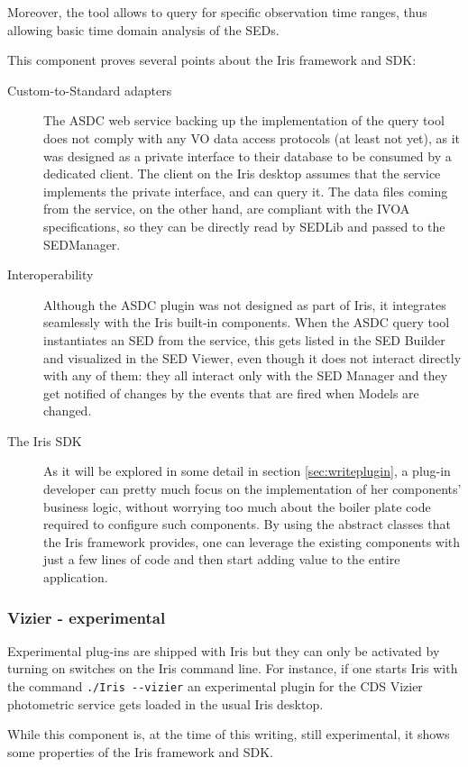 \documentclass[5p]{elsarticle}
\begin{document}
Moreover, the tool allows to query for specific observation time ranges, thus allowing basic time domain analysis of the SEDs.

This component proves several points about the Iris framework and SDK:
\begin{description}
\item[Custom-to-Standard adapters] The ASDC web service backing up the implementation of the query tool does not comply with any VO data access protocols (at least not yet), as it was designed as a private interface to their database to be consumed by a dedicated client. The client on the Iris desktop assumes that the service implements the private interface, and can query it. The data files coming from the service, on the other hand, are compliant with the IVOA specifications, so they can be directly read by SEDLib and passed to the SEDManager.
\item[Interoperability] Although the ASDC plugin was not designed as part of Iris, it integrates seamlessly with the Iris built-in components. When the ASDC query tool instantiates an SED from the service, this gets listed in the SED Builder and visualized in the SED Viewer, even though it does not interact directly with any of them: they all interact only with the SED Manager and they get notified of changes by the events that are fired when Models are changed.
\item[The Iris SDK] As it will be explored in some detail in section \ref{sec:writeplugin}, a plug-in developer can pretty much focus on the implementation of her components' business logic, without worrying too much about the boiler plate code required to configure such components. By using the abstract classes that the Iris framework
provides, one can leverage the existing components with just a few lines of code and then start adding value to the entire application.
\end{description}

\subsubsection{Vizier - experimental}
\label{sec:asdc}
Experimental plug-ins are shipped with Iris but they can only be activated by turning on switches on the Iris command line. For instance, if one starts Iris with the command \verb|./Iris --vizier| an experimental plugin for the CDS Vizier photometric service gets loaded in the usual Iris desktop.

While this component is, at the time of this writing, still experimental, it shows some properties of the Iris framework and SDK.
\end{document}
